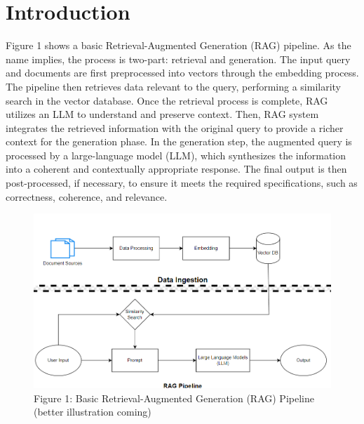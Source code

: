 \documentclass{scrartcl}
\begin{document}
\section{Introduction}

Figure 1 shows a basic Retrieval-Augmented Generation (RAG) pipeline. As the name implies, the process is two-part: retrieval and generation.
The input query and documents are first preprocessed into vectors through the embedding process.
The pipeline then retrieves data relevant to the query, performing a similarity search in the vector database. Once the retrieval process is complete, RAG utilizes an LLM to understand and preserve context. Then, RAG system integrates the retrieved information with the original query to provide a richer context for the generation phase.
In the generation step, the augmented query is processed by a large-language model (LLM), which synthesizes the information into a coherent and contextually appropriate response. The final output is then post-processed, if necessary, to ensure it meets the required specifications, such as correctness, coherence, and relevance.

\begin{figure}[H]
	\begin{center}
		\includegraphics[scale=0.7]{basic_RAG_pipeline.png}
	\end{center}
	\caption{Figure 1: Basic Retrieval-Augmented Generation (RAG) Pipeline (better illustration coming)}
	\label{fig:ascent}
\end{figure}
\end{document}
